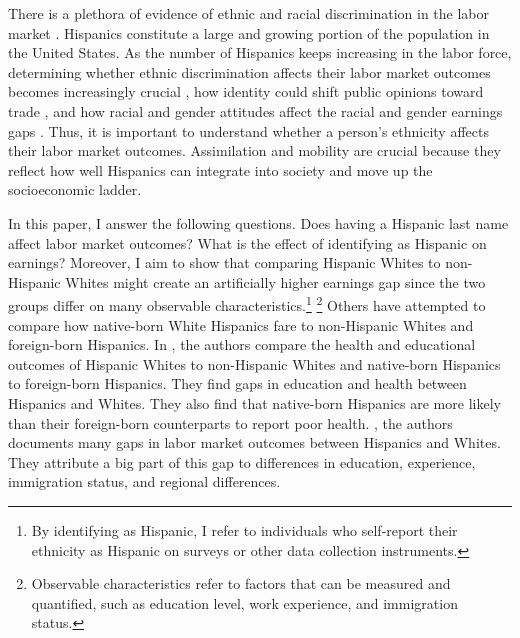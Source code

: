 \documentclass[12pt, fullpage]{article}
\begin{document}
There is a plethora of evidence of ethnic and racial discrimination in the labor market \citep{bayer2018divergent, charles2008prejudice, card1992school, fryer2004causes, rubinstein2014pride, bertrand2004emily, juhn1991accounting}. Hispanics constitute a large and growing portion of the population in the United States. As the number of Hispanics keeps increasing in the labor force, determining whether ethnic discrimination affects their labor market outcomes becomes increasingly crucial \citep{chettyUnitedStatesStill2014, chettyEffectsExposureBetter2016,chettyFadingAmericanDream2017,abramitzkyImmigrantsAssimilateMore2020a, abramitzkyNationImmigrantsAssimilation2014,abramitzkyCulturalAssimilationAge2016,chettyWhereLandOpportunity2014}, how identity could shift public opinions toward trade \citep{grossmanIdentityPoliticsTrade2021}, and how racial and gender attitudes affect the racial and gender earnings gaps \citep{charlesPrejudiceWagesEmpirical2008,charlesEffectsSexismAmerican2018}. Thus, it is important to understand whether a person's ethnicity affects their labor market outcomes. Assimilation and mobility are crucial because they reflect how well Hispanics can integrate into society and move up the socioeconomic ladder.

In this paper, I answer the following questions. Does having a Hispanic last name affect labor market outcomes? What is the effect of identifying as Hispanic on earnings? Moreover, I aim to show that comparing Hispanic Whites to non-Hispanic Whites might create an artificially higher earnings gap since the two groups differ on many observable characteristics.\footnote{By identifying as Hispanic, I refer to individuals who self-report their ethnicity as Hispanic on surveys or other data collection instruments.} \footnote{Observable characteristics refer to factors that can be measured and quantified, such as education level, work experience, and immigration status.} Others have attempted to compare how native-born White Hispanics fare to non-Hispanic Whites and foreign-born Hispanics. In \citet{antman2020ethnic,antmanEthnicAttritionObserved2016,antmanEthnicAttritionObserved2016a,antmanEthnicAttritionAssimilation2020}, the authors compare the health and educational outcomes of Hispanic Whites to non-Hispanic Whites and native-born Hispanics to foreign-born Hispanics. They find gaps in education and health between Hispanics and Whites. They also find that native-born Hispanics are more likely than their foreign-born counterparts to report poor health. \citet{davilaChangesRelativeEarnings2008}, the authors documents many gaps in labor market outcomes between Hispanics and Whites. They attribute a big part of this gap to differences in education, experience, immigration status, and regional differences. 
\end{document}
